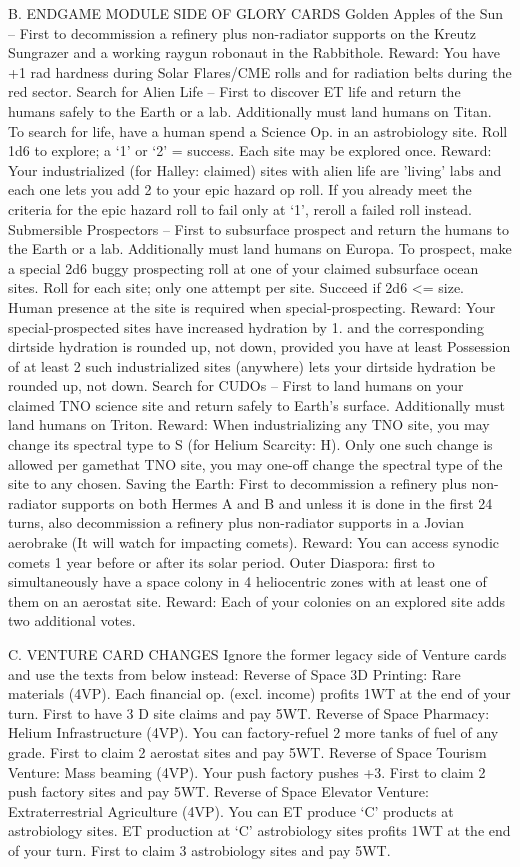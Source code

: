 \documentclass[a4paper]{book}
\begin{document}
B. ENDGAME MODULE SIDE OF GLORY CARDS
Golden Apples of the Sun – First to decommission a refinery plus non-radiator supports on the Kreutz Sungrazer and a working raygun robonaut in the Rabbithole.
Reward: You have +1 rad hardness during Solar Flares/CME rolls and for radiation belts during the red sector.
Search for Alien Life – First to discover ET life and return the humans safely to the Earth or a lab. Additionally must land humans on Titan. To search for life, have a human spend a Science Op. in an astrobiology site. Roll 1d6 to explore; a ‘1’ or ‘2’ = success. Each site may be explored once.
Reward: Your industrialized (for Halley: claimed) sites with alien life are 'living' labs and each one lets you add 2 to your epic hazard op roll. If you already meet the criteria for the epic hazard roll to fail only at ‘1’, reroll a failed roll instead.
Submersible Prospectors – First to subsurface prospect and return the humans to the Earth or a lab. Additionally must land humans on Europa. To prospect, make a special 2d6 buggy prospecting roll at one of your claimed subsurface ocean sites. Roll for each site; only one attempt per site. Succeed if 2d6 <= size. Human presence at the site is required when special-prospecting.
Reward: Your special-prospected sites have increased hydration by 1.  and the corresponding dirtside hydration is rounded up, not down, provided you have at least Possession of at least 2 such industrialized sites (anywhere) lets your dirtside hydration be rounded up, not down.
Search for CUDOs – First to land humans on your claimed TNO science site and return safely to Earth’s surface. Additionally must land humans on Triton.
Reward: When industrializing any TNO site, you may change its spectral type to S (for Helium Scarcity: H). Only one such change is allowed per gamethat TNO site, you may one-off change the spectral type of the site to any chosen.
Saving the Earth: First to decommission a refinery plus non-radiator supports on both Hermes A and B and unless it is done in the first 24 turns, also decommission a refinery plus non-radiator supports in a Jovian aerobrake (It will watch for impacting comets).
Reward: You can access synodic comets 1 year before or after its solar period.
Outer Diaspora: first to simultaneously have a space colony in 4 heliocentric zones with at least one of them on an aerostat site.
Reward: Each of your colonies on an explored site adds two additional votes.

C. VENTURE CARD CHANGES
Ignore the former legacy side of Venture cards and use the texts from below instead:
Reverse of Space 3D Printing: Rare materials (4VP).
Each financial op. (excl. income) profits 1WT at the end of your turn.
First to have 3 D site claims and pay 5WT.
Reverse of Space Pharmacy: Helium Infrastructure (4VP).
You can factory-refuel 2 more tanks of fuel of any grade.
First to claim 2 aerostat sites and pay 5WT.
Reverse of Space Tourism Venture: Mass beaming (4VP).
Your push factory pushes +3.
First to claim 2 push factory sites and pay 5WT.
Reverse of Space Elevator Venture: Extraterrestrial Agriculture (4VP).
You can ET produce ‘C’ products at astrobiology sites. ET production at ‘C’ astrobiology sites profits 1WT at the end of your turn. 
First to claim 3 astrobiology sites and pay 5WT.
\end{document}

